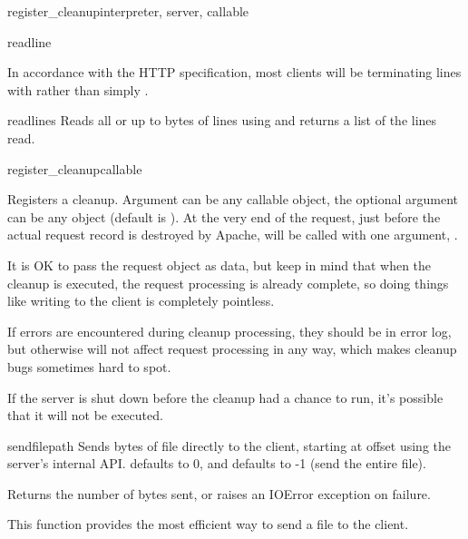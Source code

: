 \begin{funcdesc}{register_cleanup}{interpreter, server, callable}
\begin{methoddesc}[request]{readline}{}
  \begin{notice}
    In accordance with the HTTP specification, most clients will
    be terminating lines with  rather
    than simply .
  \end{notice}

\end{methoddesc}

\begin{methoddesc}[request]{readlines}{}
  Reads all or up to  bytes of lines using
   and returns a list of the lines read.
\end{methoddesc}

\begin{methoddesc}[request]{register_cleanup}{callable}

  Registers a cleanup. Argument  can be any callable
  object, the optional argument  can be any object (default is
  ). At the very end of the request, just before the actual
  request record is destroyed by Apache,  will be called
  with one argument, .

  It is OK to pass the request object as data, but keep in mind that
  when the cleanup is executed, the request processing is already
  complete, so doing things like writing to the client is completely
  pointless. 

  If errors are encountered during cleanup processing, they should be in
  error log, but otherwise will not affect request processing in any
  way, which makes cleanup bugs sometimes hard to spot.

  If the server is shut down before the cleanup had a chance to run,
  it's possible that it will not be executed.

\end{methoddesc}

\begin{methoddesc}[request]{sendfile}{path}
  Sends  bytes of file  directly to the client,
  starting at offset  using the server's internal
  API.  defaults to 0, and  defaults to -1 (send
  the entire file). 

  Returns the number of bytes sent, or raises an IOError exception
  on failure.

  This function provides the most efficient way to send a file to the
  client.
\end{methoddesc}


\end{funcdesc}

